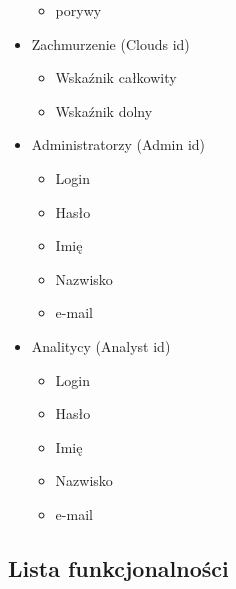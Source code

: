 \documentclass[12pt,a4paper]{article}
\begin{document}
\begin{footnotesize}
\begin{itemize}
\begin{itemize}
    \item porywy
    \end{itemize}
\item Zachmurzenie (Clouds id)
	\begin{itemize}
	\item Wskaźnik całkowity
	\item Wskaźnik dolny
	\end{itemize}
\item Administratorzy (Admin id)
    \begin{itemize}
    \item Login
    \item Hasło
    \item Imię
    \item Nazwisko
    \item e-mail
    \end{itemize}
\item Analitycy (Analyst id)
    \begin{itemize}
    \item Login
    \item Hasło
    \item Imię
    \item Nazwisko
    \item e-mail
    \end{itemize}
\end{itemize}
\end{footnotesize}
\newpage
\subsection{Lista funkcjonalności}
\begin{table}[!htb]
\centering
\caption{Poziomy kompetencji klientów} 
\end{table}
\end{document}
